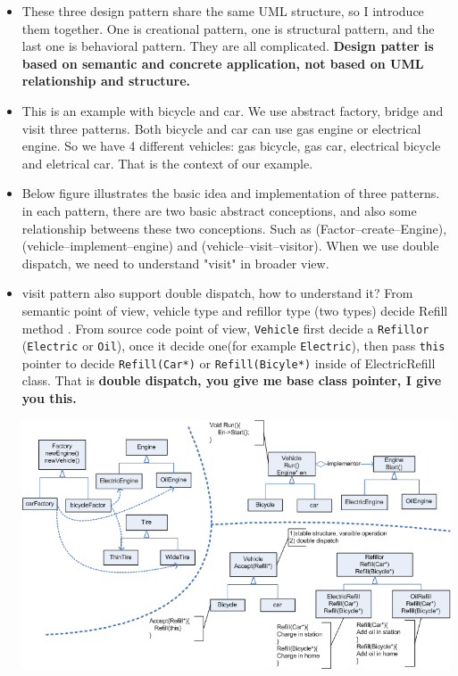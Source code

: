 \documentclass[a4paper,11pt,twoside]{book}
\begin{document}
\begin{itemize}
	\item These three design pattern share the same UML structure, so I introduce them together. One is creational pattern, one is structural pattern, and the last one is behavioral pattern. They are all complicated. \textbf{Design patter is based on semantic and concrete application, not based on UML relationship and structure.}
	
	\item This is an example with bicycle and car.  We use abstract factory, bridge and visit three patterns. Both bicycle and car can use gas engine or electrical engine. So we have 4 different vehicles: gas bicycle, gas car, electrical bicycle and eletrical car. That is the context of our example. 

	\item Below figure illustrates the basic idea and implementation of three patterns. in each pattern, there are two  basic abstract conceptions, and also some relationship betweens these two conceptions. Such as (Factor--create--Engine), (vehicle--implement--engine) and (vehicle--visit--visitor). When we use double dispatch, we need to understand "visit" in broader view. 	
	
	\item visit pattern also support double dispatch, how to understand it? From semantic point of view, vehicle type and refillor type (two types) decide Refill method . From source code point of view, \texttt{Vehicle} first decide a \texttt{Refillor} (\texttt{Electric} or \texttt{Oil}), once it decide one(for example \texttt{Electric}), then pass \texttt{this} pointer to decide \texttt{Refill(Car*)} or \texttt{Refill(Bicyle*)} inside of ElectricRefill class. That is \textbf{double dispatch, you give me base class pointer, I give you this.} 
	
\begin{center}
			\includegraphics[width=0.93\linewidth]{pics/visitor.png}
\end{center}

	    
\end{itemize}
\end{document}
